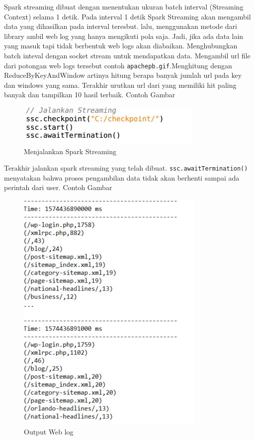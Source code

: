 \documentclass[a4paper,twoside]{article}
\begin{document}
\begin{enumerate}
		Spark streaming dibuat dengan menentukan ukuran batch interval (Streaming Context) selama 1 			detik. Pada interval 1 detik Spark Streaming akan mengambil data yang dihasilkan pada 					interval teresbut. lalu, menggunakan metode dari library ambil web log yang hanya mengikuti 			pola saja. Jadi, jika ada data lain yang masuk tapi tidak berbentuk web logs akan diabaikan. 		Menghubungkan batch inteval dengan socket stream untuk mendapatkan data. Mengambil url file 			dari potongan web logs tersebut contoh \texttt{apachepb.gif}.Menghitung dengan 							ReduceByKeyAndWindow artinya hitung berapa banyak jumlah url pada key dan windows yang sama. 		Terakhir urutkan url dari yang memiliki hit paling banyak dan tampilkan 10 hasil terbaik. 				Contoh Gambar

		\begin{figure}[H] 
		\centering  
		\includegraphics[scale=0.8]{sparkstreamingrun}  
		\caption[Gambar File input]{Menjalankan Spark Streaming} 
		\label{fig:Output-Log-Parser} 
		\end{figure}

		Terakhir jalankan spark streaming yang telah dibuat. \texttt{ssc.awaitTermination()} 					menyatakan bahwa proses pengambilan data tidak akan berhenti sampai ada perintah dari user. 			Contoh Gambar

		\begin{figure}[H] 
		\centering  
		\includegraphics[scale=0.8]{parserOutput}  
		\caption[Gambar Output Web Log]{Output Web log} 
		\label{fig:Output-Log-Parser} 
		\end{figure}


\end{enumerate}
\end{document}
